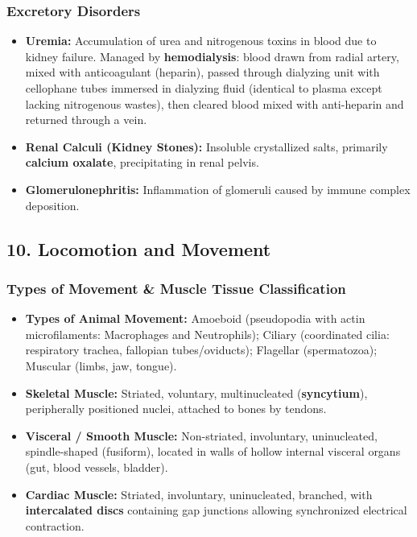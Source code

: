 \documentclass[11pt,a4paper]{article}
\begin{document}
\subsubsection{Excretory Disorders}
\begin{itemize}[leftmargin=1.5em, itemsep=2pt]
  \item \textbf{Uremia:} Accumulation of urea and nitrogenous toxins in blood due to kidney failure. Managed by \textbf{hemodialysis}: blood drawn from radial artery, mixed with anticoagulant (heparin), passed through dialyzing unit with cellophane tubes immersed in dialyzing fluid (identical to plasma except lacking nitrogenous wastes), then cleared blood mixed with anti-heparin and returned through a vein.
  \item \textbf{Renal Calculi (Kidney Stones):} Insoluble crystallized salts, primarily \textbf{calcium oxalate}, precipitating in renal pelvis.
  \item \textbf{Glomerulonephritis:} Inflammation of glomeruli caused by immune complex deposition.
\end{itemize}

\subsection{10. Locomotion and Movement}

\subsubsection{Types of Movement \& Muscle Tissue Classification}
\begin{itemize}[leftmargin=1.5em, itemsep=2pt]
  \item \textbf{Types of Animal Movement:} Amoeboid (pseudopodia with actin microfilaments: Macrophages and Neutrophils); Ciliary (coordinated cilia: respiratory trachea, fallopian tubes/oviducts); Flagellar (spermatozoa); Muscular (limbs, jaw, tongue).
  \item \textbf{Skeletal Muscle:} Striated, voluntary, multinucleated (\textbf{syncytium}), peripherally positioned nuclei, attached to bones by tendons.
  \item \textbf{Visceral / Smooth Muscle:} Non-striated, involuntary, uninucleated, spindle-shaped (fusiform), located in walls of hollow internal visceral organs (gut, blood vessels, bladder).
  \item \textbf{Cardiac Muscle:} Striated, involuntary, uninucleated, branched, with \textbf{intercalated discs} containing gap junctions allowing synchronized electrical contraction.
\end{itemize}
\end{document}
